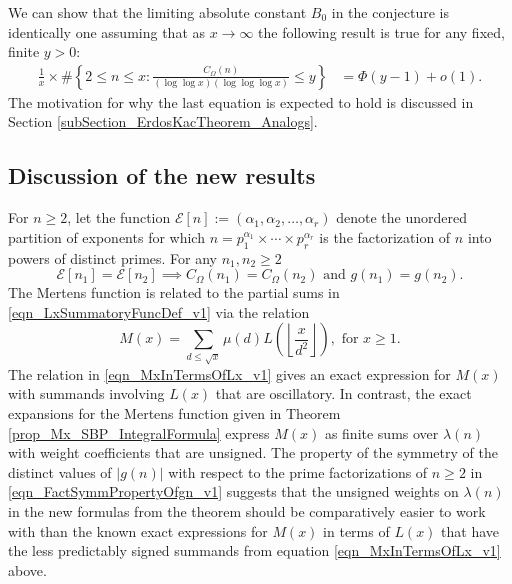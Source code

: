\documentclass[11pt,reqno,a4letter]{article}
\newcommand{\hlocalref}[1]{\hyperref[#1]{\ref{#1}}}
\numberwithin{equation}{section}
\numberwithin{figure}{section}
\numberwithin{table}{section}
\newcommand{\Floor}[2]{\ensuremath{\left\lfloor \frac{#1}{#2} \right\rfloor}}
\theoremstyle{plain}
\numberwithin{theorem}{section}
\theoremstyle{definition}
\begin{document}
We can show that the limiting absolute constant $B_0$ in the conjecture is 
identically one assuming that as $x \rightarrow \infty$ 
the following result is true for any fixed, finite $y > 0$: 
\begin{align*} 
	\frac{1}{x} \times \#\left\{2 \leq n \leq x: 
	\frac{C_{\Omega}(n)}{ (\log\log x)(\log\log\log x)} \leq y\right\} & = 
	\Phi\left(y - 1\right) + o(1).
\end{align*} 
The motivation for why the last equation is expected to hold is discussed in 
Section \hlocalref{subSection_ErdosKacTheorem_Analogs}. 

\subsection{Discussion of the new results}

For $n \geq 2$, let the function 
$\mathcal{E}[n] := (\alpha_1, \alpha_2, \ldots, \alpha_r)$ denote the unordered 
partition of exponents for which 
$n = p_1^{\alpha_1} \times \cdots \times p_r^{\alpha_r}$ is the factorization of 
$n$ into powers of distinct primes. 
For any $n_1,n_2 \geq 2$ 
\begin{equation}
\label{eqn_FactSymmPropertyOfgn_v1} 
\mathcal{E}[n_1] = \mathcal{E}[n_2] \implies C_{\Omega}(n_1) = C_{\Omega}(n_2) \text{ and } 
	g(n_1) = g(n_2). 
\end{equation}
The Mertens function is related to the partial sums in 
\eqref{eqn_LxSummatoryFuncDef_v1} 
via the relation \cite{HUMPHRIES-JNT-2013,LEHMAN-1960} 
\begin{equation}
\label{eqn_MxInTermsOfLx_v1} 
M(x) = \sum_{d \leq \sqrt{x}} \mu(d) L\left(\Floor{x}{d^2}\right), \text{ for } x \geq 1.
\end{equation}
The relation in \eqref{eqn_MxInTermsOfLx_v1} 
gives an exact expression for $M(x)$ with summands involving $L(x)$ that are oscillatory. 
In contrast, the exact expansions for the Mertens function given in 
Theorem \hlocalref{prop_Mx_SBP_IntegralFormula} 
express $M(x)$ as finite sums over $\lambda(n)$ with weight coefficients that are unsigned. 
The property of the symmetry of the distinct values of $|g(n)|$ with respect to the 
prime factorizations of $n \geq 2$ in \eqref{eqn_FactSymmPropertyOfgn_v1} 
suggests that the unsigned weights on $\lambda(n)$ in 
the new formulas from the theorem should be comparatively easier to work with than the known 
exact expressions for $M(x)$ in terms of $L(x)$ 
that have the less predictably signed summands from 
equation \eqref{eqn_MxInTermsOfLx_v1} above.
\end{document}
